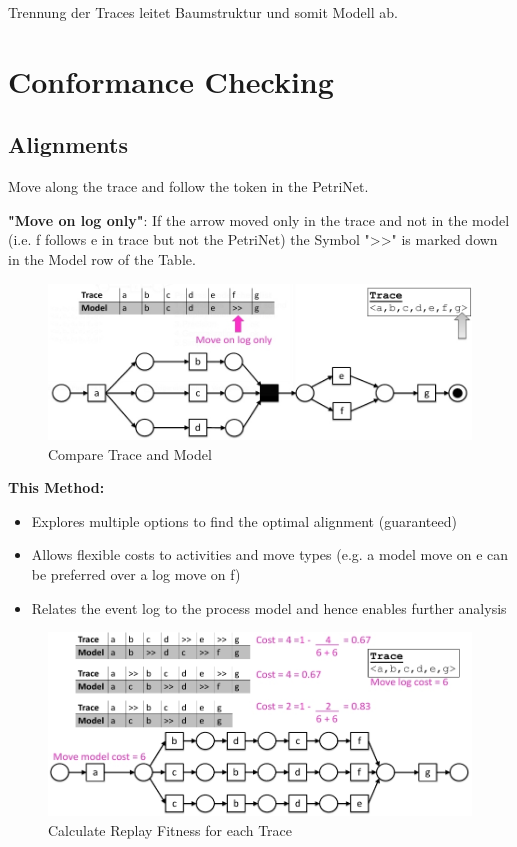 Trennung der Traces leitet Baumstruktur und somit Modell ab.

\pagebreak
\section{Conformance Checking}
\subsection{Alignments}

Move along the trace and follow the token in the PetriNet.

\noindent\textbf{"Move on log only"}: If the arrow moved only in the trace and not in the model (i.e. f follows e in trace but not the PetriNet) the Symbol ">>" is marked down in the Model row of the Table.\\

\begin{figure} [H]
\includegraphics[width=14cm]{Chapters/Notizen_Graphics/MoveLogOnly_ConformanceCheck.jpg}
\vspace*{.02\textheight}
\caption{Compare Trace and Model} 
\end{figure} 

\textbf{This Method:}
\begin{itemize}
\item Explores multiple options to find the optimal alignment (guaranteed)
\item Allows flexible costs to activities and move types (e.g. a model move on e can be preferred over a log move on f)
\item Relates the event log to the process model and hence enables further analysis



\end{itemize}



\begin{figure} [H]
\includegraphics[width=14cm]{Chapters/Notizen_Graphics/ReplayFitness_ConformanceChecking.jpg}
\caption{Calculate Replay Fitness for each Trace} 
\end{figure} 

